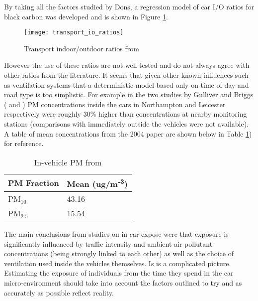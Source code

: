 By taking all the factors studied by Dons, a regression model of car I/O ratios for black carbon was developed and is shown in Figure \ref{fig:transport_io_ratios}.

\begin{figure}[H]
\centering
\texttt{[image: transport\_io\_ratios]}
\caption{Transport indoor/outdoor ratios from \cite{Dons2013}}
\label{fig:transport_io_ratios}
\end{figure}

However the use of these ratios are not well tested and do not always agree with other ratios from the literature. It seems that given other known influences such as ventilation systems that a deterministic model based only on time of day and road type is too simplistic. For example in the two studies by Gulliver and Briggs (\cite{Gulliver2004} and \cite{Gulliver2007}) PM concentrations inside the cars in Northampton and Leicester respectively were roughly 30\% higher than concentrations at nearby monitoring stations (comparisons with immediately outside the vehicles were not available). A table of mean concentrations from the 2004 paper are shown below in Table \ref{tab:gulliver_vehicle_means2}) for reference.

\begin{table}[H]
\centering
    \begin{tabular}{ | l | l |}
    \hline 
     \bfseries{PM Fraction} & \bfseries{Mean (ug/m\textsuperscript{-3})} \\ \hline
     PM$_{10}$ & 43.16\\ \hline
     PM$_{2.5}$ & 15.54\\ \hline
    \end{tabular}
\caption{In-vehicle PM from \cite{Gulliver2004}}
\label{tab:gulliver_vehicle_means2}
\end{table}

The main conclusions from studies on in-car expose were that exposure is significantly influenced by traffic intensity and ambient air pollutant concentrations (being strongly linked to each other) as well as the choice of ventilation used inside the vehicles themselves. Is is a complicated picture. Estimating the exposure of individuals from the time they spend in the car micro-environment should take into account the factors outlined to try and as accurately as possible reflect reality.


